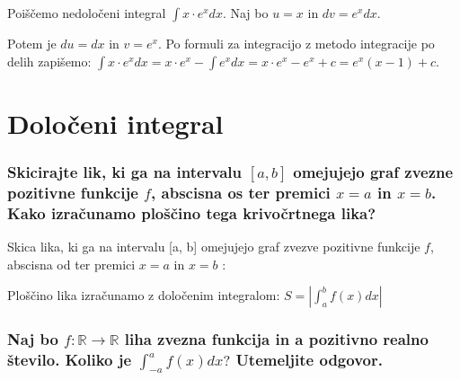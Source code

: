 \documentclass{article}
\begin{document}
Poiščemo nedoločeni integral $\int x \cdot e^{x} d x$. Naj bo $u=x$ in $d v=e^{x} d x$.

Potem je $d u=d x$ in $v=e^{x}$. Po formuli za integracijo z metodo integracije po delih zapišemo: $\int x \cdot e^{x} d x=x \cdot e^{x}-\int e^{x} d x=x \cdot e^{x}-e^{x}+c=e^{x}(x-1)+c$.

\section{Določeni integral}
\subsubsection*{Skicirajte lik, ki ga na intervalu $[a, b]$ omejujejo graf zvezne pozitivne funkcije $f$, abscisna os ter premici $x=a$ in $x=b$. Kako izračunamo ploščino tega krivočrtnega lika?}

Skica lika, ki ga na intervalu [a, b] omejujejo graf zvezve pozitivne funkcije $f$, abscisna od ter premici $x=a$ in $x=b$ :
\begin{center}
\end{center}
Ploščino lika izračunamo z določenim integralom: $S=\left|\int_{a}^{b} f(x) d x \right|$

\subsubsection*{Naj bo $f: \mathbb{R} \rightarrow \mathbb{R}$ liha zvezna funkcija in a pozitivno realno število. Koliko je $\int_{-a}^{a} f(x) d x ?$ Utemeljite odgovor.}
\end{document}

